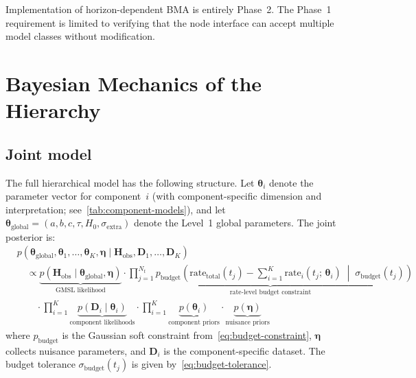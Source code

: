 \documentclass[11pt]{article}
\begin{document}
Implementation of horizon-dependent BMA is entirely Phase~2.  The Phase~1 requirement is limited to verifying that the node interface can accept multiple model classes without modification.


\section{Bayesian Mechanics of the Hierarchy}
\label{sec:mechanics}

\subsection{Joint model}

The full hierarchical model has the following structure.  Let $\boldsymbol{\theta}_i$ denote the parameter vector for component~$i$ (with component-specific dimension and interpretation; see~\cref{tab:component-models}), and let $\boldsymbol{\theta}_{\text{global}} = (a, b, c, \tau, H_0, \sigma_{\text{extra}})$ denote the Level~1 global parameters.  The joint posterior is:
\begin{align}
  &p(\boldsymbol{\theta}_{\text{global}}, \boldsymbol{\theta}_1, \ldots, \boldsymbol{\theta}_K, \boldsymbol{\eta} \mid \mathbf{H}_{\text{obs}}, \mathbf{D}_1, \ldots, \mathbf{D}_K) \nonumber \\
  &\quad \propto
  \underbrace{p(\mathbf{H}_{\text{obs}} \mid \boldsymbol{\theta}_{\text{global}}, \boldsymbol{\eta})}_{\text{GMSL likelihood}}
  \cdot \underbrace{\prod_{j=1}^{N_t} p_{\text{budget}}\!\left(\text{rate}_{\text{total}}(t_j) - \sum_{i=1}^{K} \text{rate}_i(t_j;\, \boldsymbol{\theta}_i) \;\middle|\; \sigma_{\text{budget}}(t_j)\right)}_{\text{rate-level budget constraint}} \nonumber \\
  &\qquad \cdot \prod_{i=1}^{K} \underbrace{p(\mathbf{D}_i \mid \boldsymbol{\theta}_i)}_{\text{component likelihoods}}
  \cdot \prod_{i=1}^{K} \underbrace{p(\boldsymbol{\theta}_i)}_{\text{component priors}}
  \cdot \underbrace{p(\boldsymbol{\eta})}_{\text{nuisance priors}}
  \label{eq:joint-posterior}
\end{align}
where $p_{\text{budget}}$ is the Gaussian soft constraint from~\cref{eq:budget-constraint}, $\boldsymbol{\eta}$ collects nuisance parameters, and $\mathbf{D}_i$ is the component-specific dataset.  The budget tolerance $\sigma_{\text{budget}}(t_j)$ is given by~\cref{eq:budget-tolerance}.
\end{document}
